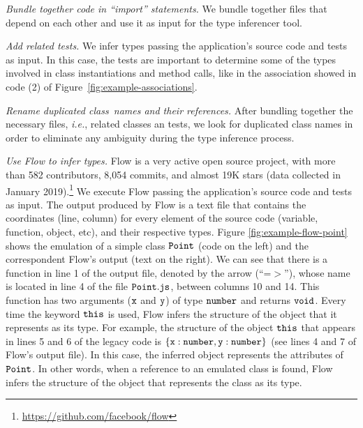 \documentclass[review]{elsarticle}
\newcommand{\aspas}[1]{{``#1''}}
\newcommand{\mcode}[1]{$\tt #1$}
\begin{document}
\vspace{2.0 mm}

\noindent \textit{Bundle together code in \aspas{import} statements.} We bundle together files that depend on each other and use it as input for the type inferencer tool. 

\vspace{2.0 mm}

\noindent \textit{Add related tests.} We infer types passing the application's source code and tests as input. In this case, the tests are important to determine some of the types involved in class instantiations and method calls, like in the association showed in code (2) of Figure~\ref{fig:example-associations}.

\vspace{2.0 mm}

\noindent \textit{Rename duplicated class names and their references.} After bundling together the necessary files, \emph{i.e.}, related classes an tests, we look for duplicated class names in order to eliminate any ambiguity during the type inference process.  

\vspace{2.0 mm}

\noindent \textit{Use Flow to infer types.} Flow is a very active open source project, with more than 582 contributors, 8,054 commits, and almost 19K stars (data collected in January 2019).\footnote{\url{https://github.com/facebook/flow}} We execute Flow passing the application's source code and tests as input. The output produced by Flow is a text file that contains the coordinates (line, column) for every element of the source code (variable, function, object, etc), and their respective types. Figure \ref{fig:example-flow-point} shows the emulation of a simple class \mcode{Point} (code on the left) and the correspondent Flow's output (text on the right). We can see that there is a function in line 1 of the output file, denoted by the arrow (\aspas{=$>$}), whose name is located in line 4 of the file \mcode{Point.js}, between columns 10 and 14. This function has two arguments (\mcode{x} and \mcode{y}) of type \mcode{number} and returns \mcode{void}. Every time the keyword \mcode{this} is used, Flow infers the structure of the object that it represents as its type. For example, the structure of the object \mcode{this} that appears in lines 5 and 6 of the legacy code is \mcode{\{x:number, y:number\}} (see lines 4 and 7 of Flow's output file). In this case, the inferred object represents the attributes of \mcode{Point}. In other words, when a reference to an emulated class is found, Flow infers the structure of the object that represents the class as its type. 
\end{document}
